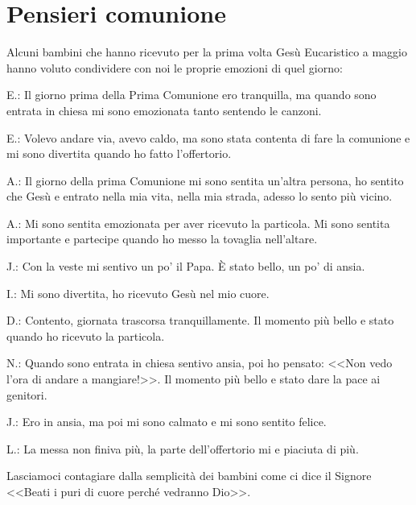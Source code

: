 \section{Pensieri comunione}

Alcuni bambini che hanno ricevuto per la prima volta Gesù Eucaristico a maggio
hanno voluto condividere con noi le proprie emozioni di quel giorno:

E.: Il giorno prima della Prima Comunione ero tranquilla, ma quando sono
entrata in chiesa mi sono emozionata tanto sentendo le canzoni.

E.: Volevo andare via, avevo caldo, ma sono stata contenta di fare la
comunione e mi sono divertita quando ho fatto l'offertorio.

A.: Il giorno della prima Comunione mi sono sentita un'altra persona, ho
sentito che Gesù e entrato nella mia vita, nella mia strada, adesso lo sento
più vicino.

A.: Mi sono sentita emozionata per aver ricevuto la particola. Mi sono sentita
importante e partecipe quando ho messo la tovaglia nell'altare.

J.: Con la veste mi sentivo un po' il Papa. È stato bello, un po' di ansia.

I.: Mi sono divertita, ho ricevuto Gesù nel mio cuore.

D.: Contento, giornata trascorsa tranquillamente. Il momento più bello e stato
quando ho ricevuto la particola.

N.: Quando sono entrata in chiesa sentivo ansia, poi ho pensato: <<Non vedo
l'ora di andare a mangiare!>>. Il momento più bello e stato dare la pace ai
genitori.

J.: Ero in ansia, ma poi mi sono calmato e mi sono sentito felice.

L.: La messa non finiva più, la parte dell'offertorio mi e piaciuta di più.

Lasciamoci contagiare dalla semplicità dei bambini come ci dice il Signore
<<Beati i puri di cuore perché vedranno Dio>>.


